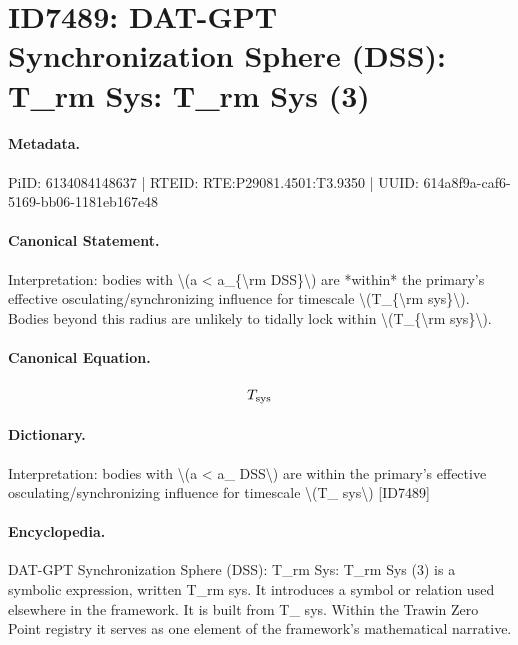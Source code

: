 \section*{ID7489: DAT-GPT Synchronization Sphere (DSS): T\_rm Sys: T\_rm Sys (3)}
\paragraph{Metadata.}
PiID: 6134084148637 | RTEID: RTE:P29081.4501:T3.9350 | UUID: 614a8f9a-caf6-5169-bb06-1181eb167e48

\paragraph{Canonical Statement.}
Interpretation: bodies with \textbackslash{}(a < a\_\{\textbackslash{}rm DSS\}\textbackslash{}) are *within* the primary’s effective osculating/synchronizing influence for timescale \textbackslash{}(T\_\{\textbackslash{}rm sys\}\textbackslash{}). Bodies beyond this radius are unlikely to tidally lock within \textbackslash{}(T\_\{\textbackslash{}rm sys\}\textbackslash{}).

\paragraph{Canonical Equation.}
\[
T_{\rm sys}
\]

\paragraph{Dictionary.}
Interpretation: bodies with \textbackslash{}(a < a\_ DSS\textbackslash{}) are within the primary’s effective osculating/synchronizing influence for timescale \textbackslash{}(T\_ sys\textbackslash{}) [ID7489]

\paragraph{Encyclopedia.}
DAT-GPT Synchronization Sphere (DSS): T\_rm Sys: T\_rm Sys (3) is a symbolic expression, written T\_rm sys. It introduces a symbol or relation used elsewhere in the framework. It is built from T\_ sys. Within the Trawin Zero Point registry it serves as one element of the framework's mathematical narrative.
